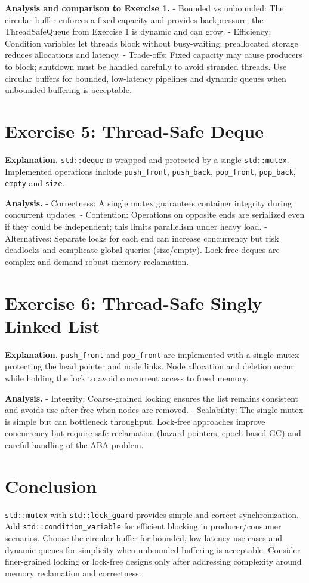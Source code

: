 \textbf{Analysis and comparison to Exercise 1.}
- Bounded vs unbounded: The circular buffer enforces a fixed capacity and provides backpressure; the ThreadSafeQueue from Exercise 1 is dynamic and can grow.  
- Efficiency: Condition variables let threads block without busy-waiting; preallocated storage reduces allocations and latency.  
- Trade-offs: Fixed capacity may cause producers to block; shutdown must be handled carefully to avoid stranded threads. Use circular buffers for bounded, low-latency pipelines and dynamic queues when unbounded buffering is acceptable.

\section{Exercise 5: Thread-Safe Deque}
\textbf{Explanation.} \texttt{std::deque} is wrapped and protected by a single \texttt{std::mutex}. Implemented operations include \texttt{push\_front}, \texttt{push\_back}, \texttt{pop\_front}, \texttt{pop\_back}, \texttt{empty} and \texttt{size}.

\textbf{Analysis.}
- Correctness: A single mutex guarantees container integrity during concurrent updates.  
- Contention: Operations on opposite ends are serialized even if they could be independent; this limits parallelism under heavy load.  
- Alternatives: Separate locks for each end can increase concurrency but risk deadlocks and complicate global queries (size/empty). Lock-free deques are complex and demand robust memory-reclamation.

\section{Exercise 6: Thread-Safe Singly Linked List}
\textbf{Explanation.} \texttt{push\_front} and \texttt{pop\_front} are implemented with a single mutex protecting the head pointer and node links. Node allocation and deletion occur while holding the lock to avoid concurrent access to freed memory.

\textbf{Analysis.}
- Integrity: Coarse-grained locking ensures the list remains consistent and avoids use-after-free when nodes are removed.  
- Scalability: The single mutex is simple but can bottleneck throughput. Lock-free approaches improve concurrency but require safe reclamation (hazard pointers, epoch-based GC) and careful handling of the ABA problem.

\section{Conclusion}
\texttt{std::mutex} with \texttt{std::lock\_guard} provides simple and correct synchronization. Add \texttt{std::condition\_variable} for efficient blocking in producer/consumer scenarios. Choose the circular buffer for bounded, low-latency use cases and dynamic queues for simplicity when unbounded buffering is acceptable. Consider finer-grained locking or lock-free designs only after addressing complexity around memory reclamation and correctness.


